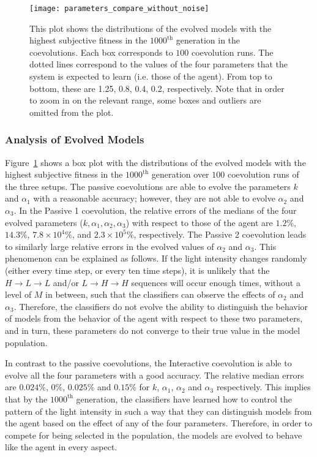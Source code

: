 \begin{figure}[!t]%
	\centering
	\texttt{[image: parameters\_compare\_without\_noise]}
	\caption{This plot shows the distributions of the evolved models with the highest subjective fitness in the $1000^\textrm{th}$ generation in the coevolutions. Each box corresponds to $100$ coevolution runs. The dotted lines correspond to the values of the four parameters that the system is expected to learn (i.e. those of the agent). From top to bottom, these are 1.25, 0.8, 0.4, 0.2, respectively. Note that in order to zoom in on the relevant range, some boxes and outliers are omitted from the plot.\label{fig:parameters_compare_without_noise}}
\end{figure}

\subsubsection{Analysis of Evolved Models}\label{sec:analysis_evolved_models_deterministic_interaction}

Figure~\ref{fig:parameters_compare_without_noise} shows a box plot with the distributions of the evolved models with the highest subjective fitness in the $1000^\textrm{th}$ generation over $100$ coevolution runs of the three setups. The passive coevolutions are able to evolve the parameters $k$ and $\alpha_1$ with a reasonable accuracy; however, they are not able to evolve $\alpha_2$ and $\alpha_3$. In the Passive 1 coevolution, the relative errors of the medians of the four evolved parameters ($k,\alpha_1,\alpha_2,\alpha_3$) with respect to those of the agent are $1.2\%$, $14.3\%$, $7.8\times10^4\%$, and $2.3\times10^5\%$, respectively. The Passive 2 coevolution leads to similarly large relative errors in the evolved values of $\alpha_2$ and $\alpha_3$. This phenomenon can be explained as follows. If the light intensity changes randomly (either every time step, or every ten time steps), it is unlikely that the 
$H\rightarrow L\rightarrow L$ and/or $L\rightarrow H\rightarrow H$ sequences 
will occur enough times, without a level of $M$ in between, such that the classifiers can observe the effects of $\alpha_2$ and $\alpha_3$. Therefore, the classifiers do not evolve the ability to distinguish the behavior of models from the behavior of the agent with respect to these two parameters, and in turn, these parameters do not converge to their true value in the model population.

In contrast to the passive coevolutions, the Interactive coevolution is able to evolve all the four parameters with a good accuracy. The relative median errors are $0.024\%$, $0\%$, $0.025\%$ and $0.15\%$ for $k$, $\alpha_1$, $\alpha_2$ and $\alpha_3$ respectively. This implies that by the $1000^{\textrm{th}}$ generation, the classifiers have learned how to control the pattern of the light intensity in such a way that they can distinguish models from the agent based on the effect of any of the four parameters. Therefore, in order to compete for being selected in the population, the models are evolved to behave like the agent in every aspect.

